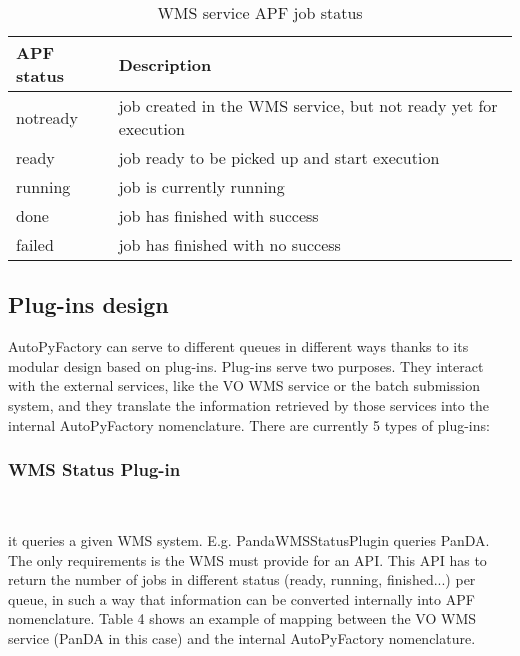 \documentclass[a4paper]{jpconf}
\begin{document}
\begin{table}
   \begin{center}
      \begin{tabular}{l l}
         \hline
         \textbf{APF status} & \textbf{Description} \\
         \hline
         notready &     job created in the WMS service, but not ready yet for execution\\ 
         ready    &     job ready to be picked up and start execution                  \\ 
         running  &     job is currently running                                       \\ 
         done     &     job has finished with success                                  \\ 
         failed   &     job has finished with no success                               \\ 
         \hline
      \end{tabular}
   \end{center}
   \caption{WMS service APF job status}
   \label{wms job status}
\end{table}

\subsection{Plug-ins design}

AutoPyFactory can serve to different queues in different ways 
thanks to its modular design based on plug-ins. 
Plug-ins serve two purposes. 
They interact with the external services, like the VO WMS service or the batch submission system,
and they translate the information retrieved by those services into the internal AutoPyFactory nomenclature.
There are currently 5 types of plug-ins:

\subsubsection{WMS Status Plug-in}

~

\noindent it queries a given WMS system. E.g. PandaWMSStatusPlugin queries PanDA. 
The only requirements is the WMS must provide for an API. 
This API has to return the number of jobs in different status (ready, running, finished...) per queue, 
in such a way that information can be converted internally into APF nomenclature. 
Table 4 shows an example of mapping between the VO WMS service (PanDA in this case)
and the internal AutoPyFactory nomenclature.
\end{document}

